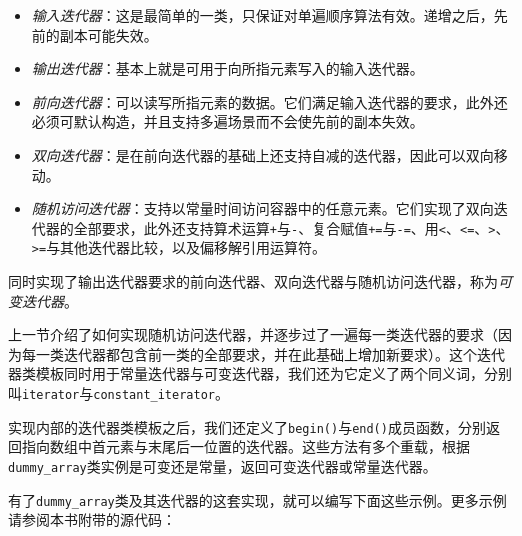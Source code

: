 \begin{itemize}
\item \textit{输入迭代器}：这是最简单的一类，只保证对单遍顺序算法有效。递增之后，先前的副本可能失效。



\item \textit{输出迭代器}：基本上就是可用于向所指元素写入的输入迭代器。



\item \textit{前向迭代器}：可以读写所指元素的数据。它们满足输入迭代器的要求，此外还必须可默认构造，并且支持多遍场景而不会使先前的副本失效。



\item \textit{双向迭代器}：是在前向迭代器的基础上还支持自减的迭代器，因此可以双向移动。



\item \textit{随机访问迭代器}：支持以常量时间访问容器中的任意元素。它们实现了双向迭代器的全部要求，此外还支持算术运算\texttt{+}与\texttt{-}、复合赋值\texttt{+=}与\texttt{-\allowbreak{}=}、用\texttt{<}、\texttt{<\allowbreak{}=}、\texttt{>}、\texttt{>\allowbreak{}=}与其他迭代器比较，以及偏移解引用运算符。

\end{itemize}



同时实现了输出迭代器要求的前向迭代器、双向迭代器与随机访问迭代器，称为\textit{可变迭代器}。



上一节介绍了如何实现随机访问迭代器，并逐步过了一遍每一类迭代器的要求（因为每一类迭代器都包含前一类的全部要求，并在此基础上增加新要求）。这个迭代器类模板同时用于常量迭代器与可变迭代器，我们还为它定义了两个同义词，分别叫\texttt{iterator}与\texttt{constant\_\allowbreak{}iterator}。



实现内部的迭代器类模板之后，我们还定义了\texttt{begin()}与\texttt{end()}成员函数，分别返回指向数组中首元素与末尾后一位置的迭代器。这些方法有多个重载，根据\texttt{dummy\_\allowbreak{}array}类实例是可变还是常量，返回可变迭代器或常量迭代器。



有了\texttt{dummy\_\allowbreak{}array}类及其迭代器的这套实现，就可以编写下面这些示例。更多示例请参阅本书附带的源代码：



